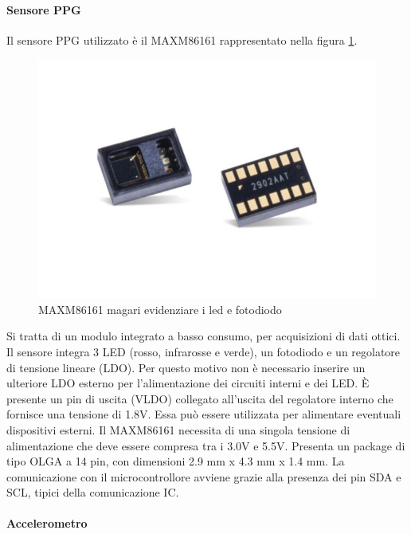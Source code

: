 \paragraph{Sensore PPG} Il sensore PPG utilizzato è il MAXM86161 rappresentato nella figura \ref{fig:ImmagineMAXM86161}.
\begin{figure}[tb]
	\centering
	\includegraphics[width=0.8\linewidth]{ImageFiles/Hardware/ImmagineMAXM86161}
	\caption{MAXM86161 magari evidenziare i led e fotodiodo}
	\label{fig:ImmagineMAXM86161}
\end{figure}
Si tratta di un modulo integrato a basso consumo, per acquisizioni di dati ottici. Il sensore integra 3 LED (rosso, infrarosse e verde), un fotodiodo e un regolatore di tensione lineare (LDO). Per questo motivo non è necessario inserire un ulteriore LDO esterno per l'alimentazione dei circuiti interni e dei LED. \`E presente un pin di uscita (VLDO) collegato all'uscita del regolatore interno che fornisce una tensione di 1.8V. Essa può essere utilizzata per alimentare eventuali dispositivi esterni. Il MAXM86161 necessita di una singola tensione di alimentazione che deve essere compresa tra i 3.0V e 5.5V. Presenta un package di tipo OLGA a 14 pin, con dimensioni 2.9 mm x 4.3 mm x 1.4 mm. La comunicazione con il microcontrollore avviene grazie alla presenza dei pin SDA e SCL, tipici della comunicazione IC.

\paragraph{Accelerometro}

\cite{STElectronicsLIS2DW12}

